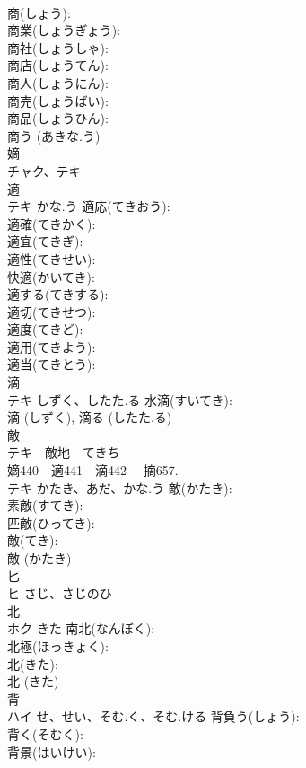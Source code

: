 \documentclass[8pt]{extreport}
\begin{document}
\begin{CJK}{UTF8}{min}
\\	商(しょう): 
\\	商業(しょうぎょう): 
\\	商社(しょうしゃ): 
\\	商店(しょうてん): 
\\	商人(しょうにん): 
\\	商売(しょうばい): 
\\	商品(しょうひん): 
\\	商う (あきな.う)
\\	嫡			
\\	チャク、テキ			
\\	適			
\\	テキ	かな.う	適応(てきおう): 
\\	適確(てきかく): 
\\	適宜(てきぎ): 
\\	適性(てきせい): 
\\	快適(かいてき): 
\\	適する(てきする): 
\\	適切(てきせつ): 
\\	適度(てきど): 
\\	適用(てきよう): 
\\	適当(てきとう): 
\\	滴			
\\	テキ	しずく、したた.る	水滴(すいてき): 
\\	滴 (しずく), 滴る (したた.る)
\\	敵			
\\	テキ　敵地　てきち
\\	嫡440　適441　滴442 　摘657.	
\\	テキ	かたき、あだ、かな.う	敵(かたき): 
\\	素敵(すてき): 
\\	匹敵(ひってき): 
\\	敵(てき): 
\\	敵 (かたき)
\\	匕			
\\	ヒ	さじ、さじのひ		
\\	北			
\\	ホク	きた	南北(なんぼく): 
\\	北極(ほっきょく): 
\\	北(きた): 
\\	北 (きた)
\\	背			
\\	ハイ	せ、せい、そむ.く、そむ.ける	背負う(しょう): 
\\	背く(そむく): 
\\	背景(はいけい): 

\end{CJK}
\end{document}
